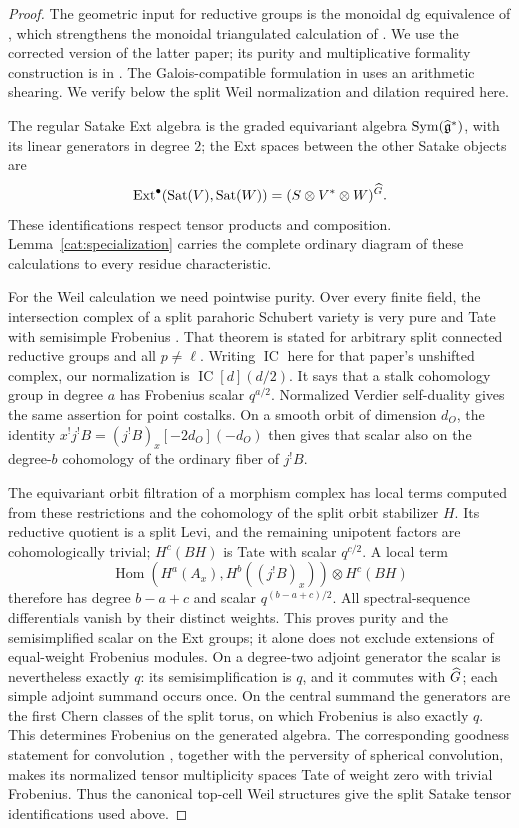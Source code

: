 \begin{proof}
The geometric input for reductive groups is the monoidal dg equivalence
of \cite[Theorem~6.6.1]{BZSV}, which strengthens the monoidal
triangulated calculation of \cite[Theorem~5]{BF}. We use the
corrected version of the latter paper; its purity and multiplicative
formality construction is in \cite[Sections~6.5--6.6]{BF}.
The Galois-compatible formulation in
\cite[Theorem~6.7.5]{BZSV} uses an arithmetic shearing. We verify below
the split Weil normalization and dilation required here.

The regular Satake Ext algebra is the graded equivariant algebra
$\operatorname{Sym}(\widehat{\mathfrak g}^*)$, with its linear generators in degree $2$;
the Ext spaces between the other Satake objects are
\[
 \operatorname{Ext}^{\bullet}
       (\operatorname{Sat}(V),\operatorname{Sat}(W))
   =(S\otimes V^*\otimes W)^{\widehat G}.
\]
These identifications respect tensor products and composition.
Lemma~\ref{cat:specialization} carries the complete ordinary diagram
of these calculations to every residue characteristic.

For the Weil calculation we need pointwise purity. Over every finite
field, the intersection complex of a split parahoric Schubert variety
is very pure and Tate with semisimple Frobenius
\cite[Section~1.2 and Theorem~2.2.1]{DCHL}. That theorem is stated for
arbitrary split connected reductive groups and all $p\ne\ell$.
Writing $\operatorname{IC}$ here for that paper's unshifted complex,
our normalization is $\operatorname{IC}[d](d/2)$. It says that a
stalk cohomology group in degree $a$ has Frobenius scalar $q^{a/2}$.
Normalized Verdier self-duality gives the same assertion for point
costalks. On a smooth orbit of dimension $d_O$, the identity
$x^!j^!B=(j^!B)_x[-2d_O](-d_O)$ then gives that scalar also on the
degree-$b$ cohomology of the ordinary fiber of $j^!B$.

The equivariant orbit filtration of a morphism complex has local
terms computed from these restrictions and the cohomology of the
split orbit stabilizer $H$. Its reductive quotient is a split Levi,
and the remaining unipotent factors are cohomologically trivial;
$H^c(BH)$ is Tate with scalar $q^{c/2}$. A local term
\[
 \operatorname{Hom}(H^a(A_x),H^b((j^!B)_x))\otimes H^c(BH)
\]
therefore has degree $b-a+c$ and scalar $q^{(b-a+c)/2}$.
All spectral-sequence differentials vanish by their distinct
weights. This proves purity and the semisimplified scalar on the
Ext groups; it alone does not exclude extensions of equal-weight
Frobenius modules. On a degree-two adjoint generator the scalar is
nevertheless exactly $q$: its semisimplification is $q$, and it
commutes with $\widehat G$; each simple adjoint summand occurs once. On the
central summand the generators are the first Chern classes of the
split torus, on which Frobenius is also exactly $q$. This determines
Frobenius on the generated algebra. The corresponding goodness
statement for convolution \cite[Corollary~2.2.3]{DCHL}, together with
the perversity of spherical convolution, makes its normalized
tensor multiplicity spaces Tate of weight zero with trivial
Frobenius. Thus the canonical top-cell Weil structures give the
split Satake tensor identifications used above.


\end{proof}
